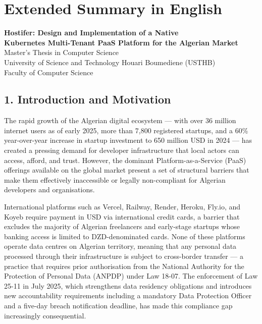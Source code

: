 
\chapter*{Extended Summary in English}

\begin{center}
    {\large\textbf{Hostifer: Design and Implementation of a Native\\
    Kubernetes Multi-Tenant PaaS Platform for the Algerian Market}}\\[12pt]
    {\normalsize Master's Thesis in Computer Science\\
    University of Science and Technology Houari Boumediene (USTHB)\\
    Faculty of Computer Science}
\end{center}

\vspace{16pt}

\section*{1. Introduction and Motivation}

The rapid growth of the Algerian digital ecosystem — with over 36 million internet users as of early 2025, more than 7,800 registered startups, and a 60\% year-over-year increase in startup investment to 650 million USD in 2024 — has created a pressing demand for developer infrastructure that local actors can access, afford, and trust. However, the dominant Platform-as-a-Service (PaaS) offerings available on the global market present a set of structural barriers that make them effectively inaccessible or legally non-compliant for Algerian developers and organisations.

International platforms such as Vercel, Railway, Render, Heroku, Fly.io, and Koyeb require payment in USD via international credit cards, a barrier that excludes the majority of Algerian freelancers and early-stage startups whose banking access is limited to DZD-denominated cards. None of these platforms operate data centres on Algerian territory, meaning that any personal data processed through their infrastructure is subject to cross-border transfer — a practice that requires prior authorisation from the National Authority for the Protection of Personal Data (ANPDP) under Law 18-07. The enforcement of Law 25-11 in July 2025, which strengthens data residency obligations and introduces new accountability requirements including a mandatory Data Protection Officer and a five-day breach notification deadline, has made this compliance gap increasingly consequential.

